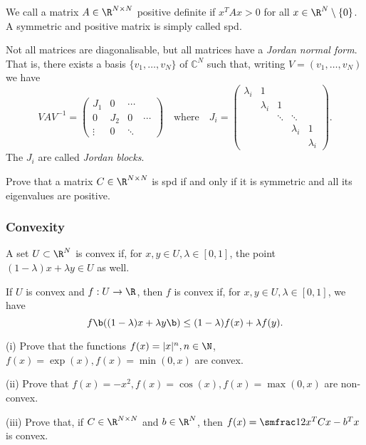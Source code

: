 We call a matrix $A \in \R^{N \times N}$ positive definite if $x^T A x
> 0$ for all $x \in \R^N \setminus \{0\}$. A symmetric and positive
matrix is simply called spd.

Not all matrices are diagonalisable, but all matrices have a {\em
  Jordan normal form}. That is, there exists a basis $\{v_1, \dots,
v_N\}$ of $\mathbb{C}^N$ such that, writing $V = (v_1, \dots, v_N)$ we
have
\begin{displaymath}
  V A V^{-1} = \left( \begin{matrix}
      J_1 & 0 & \cdots & \\
      0 & J_2 & 0 & \cdots \\
      \vdots & 0 & \ddots &
      \end{matrix} \right) \quad \text{where} \quad
      J_i = \left(\begin{matrix}
      \lambda_i & 1 & & & \\
            & \lambda_i & 1 & &   \\
            &   & \ddots & \ddots &  \\
            & & & \lambda_i & 1 \\
            & & & &  \lambda_i
    \end{matrix} \right).
\end{displaymath}
The $J_i$ are called {\em Jordan blocks}.


\begin{exercise}
  Prove that a matrix $C \in \R^{N \times N}$ is spd if and only if it
  is symmetric and all its eigenvalues are positive.
\end{exercise}


\subsubsection{Convexity}
%
A set $U \subset \R^N$ is convex if, for $x, y \in U, \lambda \in [0,
1]$, the point $(1-\lambda) x + \lambda y \in U$ as well.

If $U$ is convex and $f : U \to \R$, then $f$ is convex if, for $x, y
\in U, \lambda \in [0, 1]$, we have
\begin{equation}
  \label{eq:convex_f}
  f\b( (1-\lambda) x + \lambda y \b) \leq (1-\lambda) f(x) + \lambda f(y).
\end{equation}

\begin{exercise}
  (i) Prove that the functions $f(x) = |x|^n, n \in \N$, $f(x) =
  \exp(x), f(x) = \min(0, x)$ are convex.

  (ii) Prove that $f(x) = -x^2, f(x) = \cos(x), f(x) = \max(0, x)$ are
  non-convex.

  (iii) Prove that, if $C \in \R^{N \times N}$ and $b \in \R^N$, then
  $f(x) = \smfrac12 x^T C x - b^T x$ is convex.
\end{exercise}




